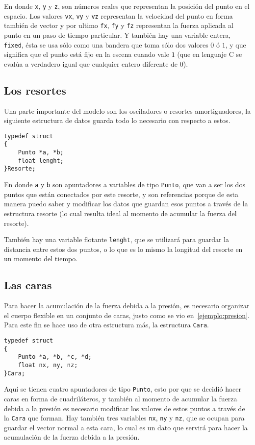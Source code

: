 En donde \verb|x|, \verb|y| y \verb|z|, son números reales que representan la posición del punto en el espacio.
Los valores \verb|vx|, \verb|vy| y \verb|vz| representan la velocidad del punto en forma también de vector y por ultimo \verb|fx|, \verb|fy| y \verb|fz| representan la fuerza aplicada al punto en un paso de tiempo particular.
Y también hay una variable entera, \verb|fixed|, ésta se usa sólo como una bandera que toma sólo dos valores $0$ ó $1$, y que significa que el punto está fijo en la escena cuando vale $1$ (que en lenguaje C se evalúa a verdadero igual que cualquier entero diferente de $0$).

\subsection{Los resortes}

Una parte importante del modelo son los osciladores o resortes amortiguadores, la siguiente estructura de datos guarda todo lo necesario con respecto a estos.

\begin{verbatim}
typedef struct
{
    Punto *a, *b;
    float lenght;
}Resorte;
\end{verbatim} 

En donde \verb|a| y \verb|b| son apuntadores a variables de tipo \verb|Punto|, que van a ser los dos puntos que están conectados por este resorte, y son referencias porque de esta manera puedo saber y modificar los datos que guardan esos puntos a través de la estructura resorte (lo cual resulta ideal al momento de acumular la fuerza del resorte).

También hay una variable flotante \verb|lenght|, que se utilizará para guardar la distancia entre estos dos puntos, o lo que es lo mismo la longitud del resorte en un momento del tiempo.

\subsection{Las caras}
Para hacer la acumulación de la fuerza debida a la presión, es necesario organizar el cuerpo flexible en un conjunto de caras, justo como se vio en~\ref{ejemplo:presion}.
Para este fin se hace uso de otra estructura más, la estructura \verb|Cara|.
\begin{verbatim}
typedef struct
{
    Punto *a, *b, *c, *d;
    float nx, ny, nz;
}Cara;
\end{verbatim}
Aquí se tienen cuatro apuntadores de tipo \verb|Punto|, esto por que se decidió hacer caras en forma de cuadriláteros, y también al momento de acumular la fuerza debida a la presión es necesario modificar los valores de estos puntos a través de la \verb|Cara| que forman.
Hay también tres variables \verb|nx|, \verb|ny| y \verb|nz|, que se ocupan para guardar el vector normal a esta cara, lo cual es un dato que servirá para hacer la acumulación de la fuerza debida a la presión.
